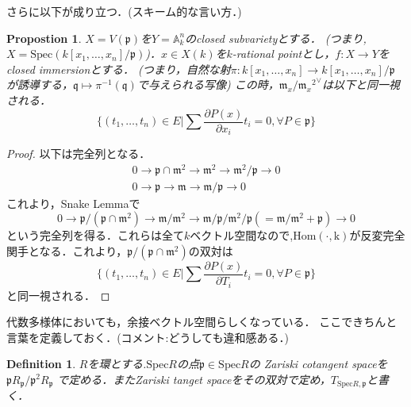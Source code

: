 \documentclass{ujarticle}
\newtheorem{dfn}[thm]{Definition}
\newtheorem{prop}[thm]{Propostion}
\begin{document}
さらに以下が成り立つ．(スキーム的な言い方．)
\begin{prop}
 $X=V( \mathfrak{p})$を$Y=\mathbb{A}_k^n$のclosed subvarietyとする．
 (つまり,$X=\mathrm{Spec}(k[x_1,\dots,x_n]/\mathfrak{p})$)．$x \in X(k)$を$k$-rational pointとし，$f:X \to Y$をclosed immersionとする．
 (つまり，自然な射$\pi :k[x_1,\dots,x_n] \to k[x_1,\dots,x_n]/\mathfrak{p} $
 が誘導する，$\mathfrak{q} \mapsto \pi^{-1}(\mathfrak{q}) $で与えられる写像)
 この時，${\mathfrak{m}_x/{\mathfrak{m}_x}^2}^{\vee}$は以下と同一視される．
 \begin{equation*}
  \{ (t_1,\dots,t_n) \in E | \sum  \frac{\partial P(x)}{ \partial x_i} t_i =0, \forall P \in \mathfrak{p} \}
 \end{equation*}
\end{prop}
\begin{proof}
  以下は完全列となる．
  \begin{eqnarray*}
    0 \to \mathfrak{p} \cap \mathfrak{m}^2 \to \mathfrak{m}^2 \to \mathfrak{m}^2/\mathfrak{p} \to 0 \\
    0 \to     \mathfrak{p}\to \mathfrak{m} \to \mathfrak{m}/\mathfrak{p} \to 0
  \end{eqnarray*}
これより，Snake Lemmaで
\begin{equation*}
  0 \to     \mathfrak{p}/(\mathfrak{p} \cap \mathfrak{m}^2) \to \mathfrak{m}/\mathfrak{m}^2 \to \mathfrak{m}/\mathfrak{p}/ \mathfrak{m}^2/\mathfrak{p}(= \mathfrak{m}/\mathfrak{m}^2 + \mathfrak{p})  \to 0
\end{equation*}
という完全列を得る．これらは全て$k$ベクトル空間なので,$\mathrm{Hom(\cdot,k)}$が反変完全関手となる．これより，$\mathfrak{p}/(\mathfrak{p} \cap \mathfrak{m}^2)$の双対は
\begin{equation*}
 \{ (t_1,\dots,t_n) \in E | \sum  \frac{\partial P(x)}{ \partial T_i} t_i =0, \forall P \in \mathfrak{p} \}
\end{equation*}
と同一視される．
\end{proof}

代数多様体においても，余接ベクトル空間らしくなっている．
ここできちんと言葉を定義しておく．(コメント:どうしても違和感ある．)
\begin{dfn}
  $R$を環とする.$\mathrm{Spec}R$の点$\mathfrak{p} \in \mathrm{Spec}R$の
  Zariski cotangent spaceを$\mathfrak{p}R_{\mathfrak{p}}/\mathfrak{p}^2R_{\mathfrak{p}}$
  で定める．またZariski tanget spaceをその双対で定め，$T_{\mathrm{Spec}R,\mathfrak{p}}$と書く．
\end{dfn}
\end{document}
